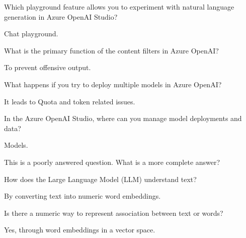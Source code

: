 \begin{qanda}
	\begin{question}
Which playground feature allows you to experiment with natural language generation in Azure OpenAI Studio?
	\end{question}
	\begin{answer}
Chat playground.
	\end{answer}
\end{qanda}

\begin{qanda}
	\begin{question}
What is the primary function of the content filters in Azure OpenAI?
	\end{question}
	\begin{answer}
To prevent offensive output.
	\end{answer}
\end{qanda}

\begin{qanda}
	\begin{question}
What happens if you try to deploy multiple models in Azure OpenAI?
	\end{question}
	\begin{answer}
It leads to Quota and token related issues.
	\end{answer}
\end{qanda}

\begin{qanda}
	\begin{question}
In the Azure OpenAI Studio, where can you manage model deployments and data?
	\end{question}
	\begin{answer}
Models.
	\end{answer}
\end{qanda}

This is a poorly answered question.  What is a more complete answer?

\begin{qanda}
	\begin{question}
How does the Large Language Model (LLM) understand text?
	\end{question}
	\begin{answer}
By converting text into numeric word embeddings.
	\end{answer}
\end{qanda}

\begin{qanda}
	\begin{question}
Is there a numeric way to represent association between text or words?
	\end{question}
	\begin{answer}
Yes, through word embeddings in a vector space.
	\end{answer}
\end{qanda}

